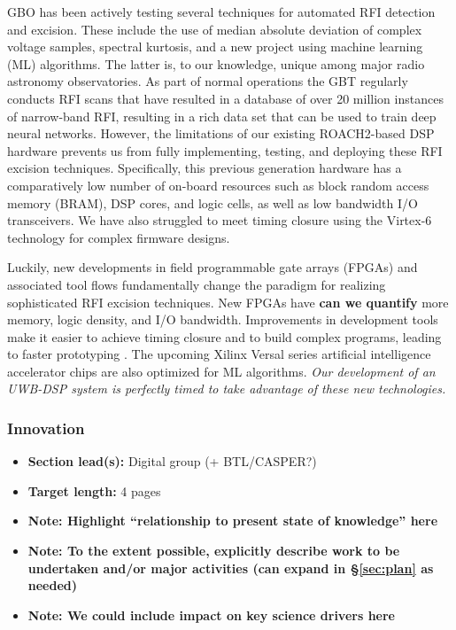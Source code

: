 \documentclass[10pt]{myNSF}
\begin{document}
 GBO has been actively testing several
techniques for automated RFI detection and excision.  These include
the use of median absolute deviation of complex voltage samples,
spectral kurtosis, and a new project using machine learning (ML)
algorithms.  The latter is, to our knowledge, unique among major radio
astronomy observatories.  As part of normal operations the GBT
regularly conducts RFI scans that have resulted in a database of over
20 million instances of narrow-band RFI, resulting in a rich data set
that can be used to train deep neural networks.  However, the
limitations of our existing ROACH2-based DSP hardware prevents us from
fully implementing, testing, and deploying these RFI excision
techniques.  Specifically, this previous generation hardware has a
comparatively low number of on-board resources such as block random
access memory (BRAM), DSP cores, and logic cells, as well as low bandwidth
I/O transceivers.  We have also struggled to meet timing closure using
the Virtex-6 technology for complex firmware designs.

Luckily, new developments in field programmable gate arrays (FPGAs)
and associated tool flows fundamentally change the paradigm for
realizing sophisticated RFI excision techniques.  New FPGAs have
\textbf{can we quantify} more memory, logic density, and I/O
bandwidth.  Improvements in development tools make it easier to
achieve timing closure and to build complex programs, leading to
faster prototyping .  The upcoming Xilinx Versal series artificial
intelligence accelerator chips are also optimized for ML algorithms.
\emph{Our development of an UWB-DSP system is perfectly timed to take
  advantage of these new technologies.}

\subsubsection{Innovation}
\label{sec:innovation}

\begin{itemize}
\item{\textbf{Section lead(s):} Digital group (+ BTL/CASPER?)}
\item{\textbf{Target length:} 4 pages}
\item{\textbf{Note: Highlight ``relationship to present state of
      knowledge'' here}}
\item{\textbf{Note: To the extent possible, explicitly describe work
      to be undertaken and/or major activities (can expand in
      \S\ref{sec:plan} as needed)}}
\item{\textbf{Note: We could include impact on key science drivers
      here}}
\end{itemize}
\end{document}
